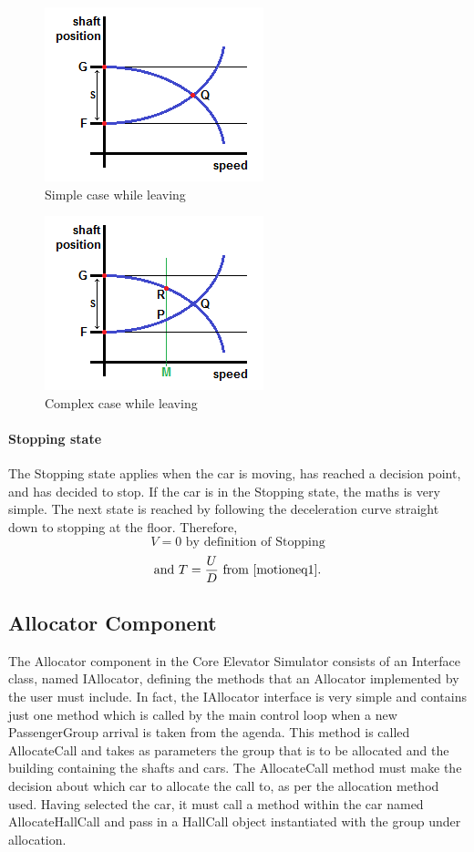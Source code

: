 \documentclass{UoYCSproject}
\begin{document}
\begin{figure} [h]
	\centering
	\includegraphics{leaving_simp.png}
	\caption{Simple case while leaving}
	\label{leavingsimp}
\end{figure}

\begin{figure} [h]
	\centering
	\includegraphics{leaving_comp.png}
	\caption{Complex case while leaving}
	\label{leavingcomp}
\end{figure}

\paragraph{Stopping state}

The Stopping state applies when the car is moving, has reached a decision point, and has decided to stop.  If the car is in the Stopping state, the maths is very simple.  The next state is reached by following the deceleration curve straight down to stopping at the floor.  Therefore,
\[ V=0 \text{ by definition of Stopping} \]
\[ \text{and } T=\frac{U}{D} \text{ from \autoref{motioneq1}.} \]

\subsection{Allocator Component}
\label{coresimallocatordescription}

The Allocator component in the Core Elevator Simulator consists of an Interface class, named IAllocator, defining the methods that an Allocator implemented by the user must include.  In fact, the IAllocator interface is very simple and contains just one method which is called by the main control loop when a new PassengerGroup arrival is taken from the agenda.  This method is called AllocateCall and takes as parameters the group that is to be allocated and the building containing the shafts and cars.  The AllocateCall method must make the decision about which car to allocate the call to, as per the allocation method used.  Having selected the car, it must call a method within the car named AllocateHallCall and pass in a HallCall object instantiated with the group under allocation.
\end{document}
